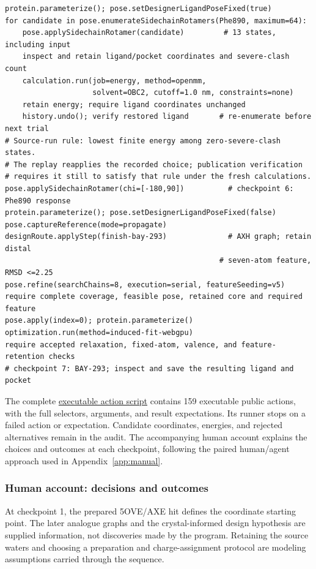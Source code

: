 \documentclass[11pt]{article}
\begin{document}
\begin{small}
\begin{minipage}{\linewidth}
\begin{lstlisting}
protein.parameterize(); pose.setDesignerLigandPoseFixed(true)
for candidate in pose.enumerateSidechainRotamers(Phe890, maximum=64):
    pose.applySidechainRotamer(candidate)         # 13 states, including input
    inspect and retain ligand/pocket coordinates and severe-clash count
    calculation.run(job=energy, method=openmm,
                    solvent=OBC2, cutoff=1.0 nm, constraints=none)
    retain energy; require ligand coordinates unchanged
    history.undo(); verify restored ligand       # re-enumerate before next trial
# Source-run rule: lowest finite energy among zero-severe-clash states.
# The replay reapplies the recorded choice; publication verification
# requires it still to satisfy that rule under the fresh calculations.
pose.applySidechainRotamer(chi=[-180,90])          # checkpoint 6: Phe890 response
protein.parameterize(); pose.setDesignerLigandPoseFixed(false)
pose.captureReference(mode=propagate)
designRoute.applyStep(finish-bay-293)              # AXH graph; retain distal
                                                 # seven-atom feature, RMSD <=2.25
pose.refine(searchChains=8, execution=serial, featureSeeding=v5)
require complete coverage, feasible pose, retained core and required feature
pose.apply(index=0); protein.parameterize()
optimization.run(method=induced-fit-webgpu)
require accepted relaxation, fixed-atom, valence, and feature-retention checks
# checkpoint 7: BAY-293; inspect and save the resulting ligand and pocket
\end{lstlisting}
\end{minipage}

The complete \href{https://molarium.org/design-history/publications/sos1/designer-intent-2026-09-04/executable.action-script.json}{executable action script} contains 159 executable public actions, with the full selectors, arguments, and result expectations. Its runner stops on a failed action or expectation. Candidate coordinates, energies, and rejected alternatives remain in the audit. The accompanying human account explains the choices and outcomes at each checkpoint, following the paired human/agent approach used in Appendix~\ref{app:manual}.

\subsubsection{Human account: decisions and outcomes}

At checkpoint 1, the prepared 5OVE/AXE hit defines the coordinate starting point. The later analogue graphs and the crystal-informed design hypothesis are supplied information, not discoveries made by the program. Retaining the source waters and choosing a preparation and charge-assignment protocol are modeling assumptions carried through the sequence.


\end{small}
\end{document}
